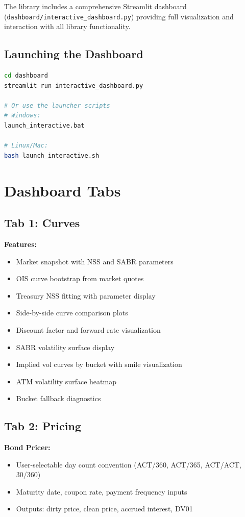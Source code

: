 \documentclass[12pt,a4paper]{report}
\newcommand{\code}[1]{\texttt{#1}}
\begin{document}
The library includes a comprehensive Streamlit dashboard (\code{dashboard/interactive\_dashboard.py}) providing full visualization and interaction with all library functionality.

\subsection{Launching the Dashboard}

\begin{lstlisting}[language=bash]
cd dashboard
streamlit run interactive_dashboard.py

# Or use the launcher scripts
# Windows:
launch_interactive.bat

# Linux/Mac:
bash launch_interactive.sh
\end{lstlisting}

\section{Dashboard Tabs}

\subsection{Tab 1: Curves}

\textbf{Features:}
\begin{itemize}
    \item Market snapshot with NSS and SABR parameters
    \item OIS curve bootstrap from market quotes
    \item Treasury NSS fitting with parameter display
    \item Side-by-side curve comparison plots
    \item Discount factor and forward rate visualization
    \item SABR volatility surface display
    \item Implied vol curves by bucket with smile visualization
    \item ATM volatility surface heatmap
    \item Bucket fallback diagnostics
\end{itemize}

\subsection{Tab 2: Pricing}

\textbf{Bond Pricer:}
\begin{itemize}
    \item User-selectable day count convention (ACT/360, ACT/365, ACT/ACT, 30/360)
    \item Maturity date, coupon rate, payment frequency inputs
    \item Outputs: dirty price, clean price, accrued interest, DV01
\end{itemize}
\end{document}
